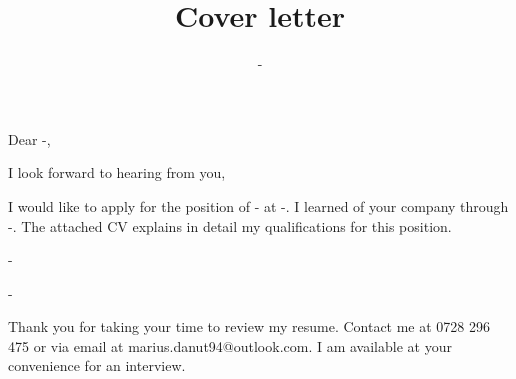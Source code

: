\documentclass[10pt,a4paper,sans]{moderncv}
\title{Cover letter}
\begin{document}
\date{-}

\opening{Dear -,}
\closing{I look forward to hearing from you,}

\makelettertitle

I would like to apply for the position of - at -. I learned of your company through -. The attached CV explains in detail my qualifications for this position.

-

-

Thank you for taking your time to review my resume. Contact me at 0728 296 475 or via email at marius.danut94@outlook.com. I am available at your convenience for an interview. 

\makeletterclosing
\end{document}
